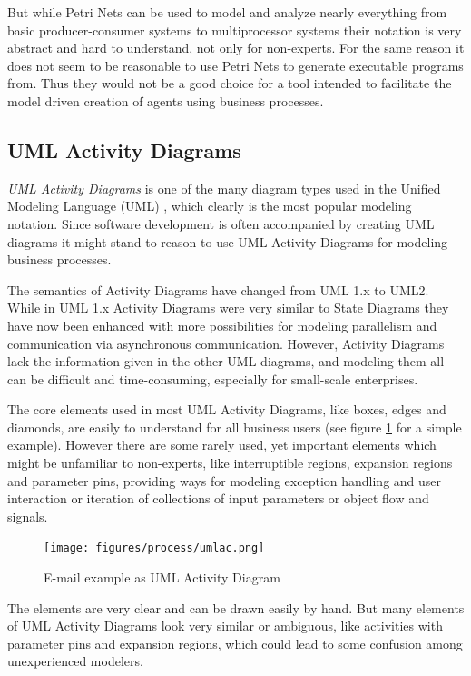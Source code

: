 But while Petri Nets can be used to model and analyze nearly everything from basic producer-consumer systems to multiprocessor systems their notation is very abstract and hard to understand, not only for non-experts. For the same reason it does not seem to be reasonable to use Petri Nets to generate executable programs from. Thus they would not be a good choice for a tool intended to facilitate the model driven creation of agents using business processes.


\subsection{UML Activity Diagrams}

\emph{UML Activity Diagrams} is one of the many diagram types used in the Unified Modeling Language (UML) \cite[Chapter 12]{spec_uml}, which clearly is the most popular modeling notation. Since software development is often accompanied by creating UML diagrams it might stand to reason to use UML Activity Diagrams for modeling business processes.

The semantics of Activity Diagrams have changed from UML 1.x to UML2. While in UML 1.x Activity Diagrams were very similar to State Diagrams they have now been enhanced with more possibilities for modeling parallelism and communication via asynchronous communication. However, Activity Diagrams lack the information given in the other UML diagrams, and modeling them all can be difficult and time-consuming, especially for small-scale enterprises.

The core elements used in most UML Activity Diagrams, like boxes, edges and diamonds, are easily to understand for all business users (see figure \ref{fig:uml-mail} for a simple example). However there are some rarely used, yet important elements which might be unfamiliar to non-experts, like interruptible regions, expansion regions and parameter pins, providing ways for modeling exception handling and user interaction or iteration of collections of input parameters or object flow and signals.

\begin{figure}[htp]
	\centering
	\texttt{[image: figures/process/umlac.png]}
	\caption{E-mail example as UML Activity Diagram}
	\label{fig:uml-mail}
\end{figure}

The elements are very clear and can be drawn easily by hand. But many elements of UML Activity Diagrams look very similar or ambiguous, like activities with parameter pins and expansion regions, which could lead to some confusion among unexperienced modelers.


